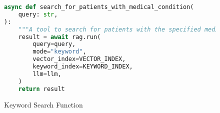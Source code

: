 \begin{figure}
	\centering
	\small
	\begin{lstlisting}[language=Python, breaklines=true]
async def search_for_patients_with_medical_condition(
    query: str,
):
    """A tool to search for patients with the specified medical condition."""
    result = await rag.run(
        query=query,
        mode="keyword",
        vector_index=VECTOR_INDEX,
        keyword_index=KEYWORD_INDEX,
        llm=llm,
    )
    return result
\end{lstlisting}
	\caption{Keyword Search Function}
	\label{fig:KeywordSearch}
\end{figure}
